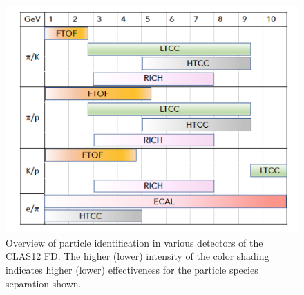 \documentclass[final,3p,twocolumn]{elsarticle}
\begin{document}
\begin{figure}[htbp!]
\centerline{\includegraphics[width=1.1\columnwidth]{CLAS12-pid.png}}
\caption{Overview of particle identification in various detectors of the CLAS12 FD. The higher (lower) intensity of the color shading
 indicates higher (lower) effectiveness for the particle species separation shown.  } 
\label{pid1}
\end{figure} 
\end{document}
